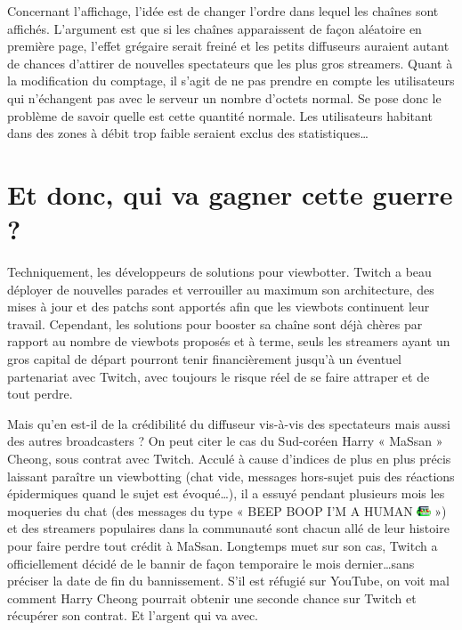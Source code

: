 \documentclass[a4paper]{article}
\begin{document}
Concernant l'affichage, l'idée est de changer l'ordre dans lequel les chaînes sont affichés. L'argument est que si les chaînes apparaissent de façon aléatoire en première page, l'effet grégaire serait freiné et les petits diffuseurs auraient autant de chances d'attirer de nouvelles spectateurs que les plus gros streamers. Quant à la modification du comptage, il s'agit de ne pas prendre en compte les utilisateurs qui n'échangent pas avec le serveur un nombre d'octets normal. Se pose donc le problème de savoir quelle est cette quantité normale. Les utilisateurs habitant dans des zones à débit trop faible seraient exclus des statistiques\ldots

\section{Et donc, qui va gagner cette guerre ?}

Techniquement, les développeurs de solutions pour viewbotter. Twitch a beau déployer de nouvelles parades et verrouiller au maximum son architecture, des mises à jour et des patchs sont apportés afin que les viewbots continuent leur travail. Cependant, les solutions pour booster sa chaîne sont déjà chères par rapport au nombre de viewbots proposés et à terme, seuls les streamers ayant un gros capital de départ pourront tenir financièrement jusqu'à un éventuel partenariat avec Twitch, avec toujours le risque réel de se faire attraper et de tout perdre.

Mais qu'en est-il de la crédibilité du diffuseur vis-à-vis des spectateurs mais aussi des autres broadcasters ? On peut citer le cas du Sud-coréen Harry « MaSsan » Cheong, sous contrat avec Twitch. Acculé à cause d'indices de plus en plus précis laissant paraître un viewbotting (chat vide, messages hors-sujet puis des réactions épidermiques quand le sujet est évoqué\ldots), il a essuyé pendant plusieurs mois les moqueries du chat (des messages du type « BEEP BOOP I'M A HUMAN \includegraphics[width=0.4cm]{MrDestructoid.png} ») et des streamers populaires dans la communauté sont chacun allé de leur histoire pour faire perdre tout crédit à MaSsan. Longtemps muet sur son cas, Twitch a officiellement décidé de le bannir de façon temporaire le mois dernier\ldots sans préciser la date de fin du bannissement. S'il est réfugié sur YouTube, on voit mal comment Harry Cheong pourrait obtenir une seconde chance sur Twitch et récupérer son contrat. Et l'argent qui va avec.
\end{document}
